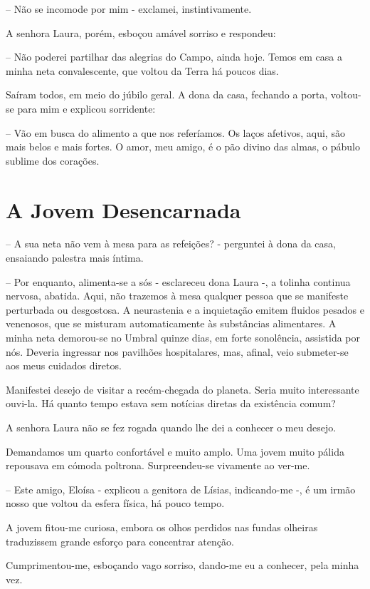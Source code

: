 \documentclass[portuguese,12pt,a4paper]{scrbook}
\begin{document}
	– Não se incomode por mim - exclamei, instintivamente.
	
	A senhora Laura, porém, esboçou amável sorriso e respondeu:
	
	– Não poderei partilhar das alegrias do Campo, ainda hoje. Temos em casa a minha neta convalescente, que voltou da Terra há poucos dias.
	
	Saíram todos, em meio do júbilo geral. A dona da casa, fechando a porta, voltou-se para mim e explicou sorridente:
	
	– Vão em busca do alimento a que nos referíamos. Os laços afetivos, aqui, são mais belos e mais fortes. O amor, meu amigo, é o pão divino das almas, o pábulo sublime dos corações.
	
	
	\chapter{A Jovem Desencarnada}
	
	– A sua neta não vem à mesa para as refeições? - perguntei à dona da casa, ensaiando palestra mais íntima.
	
	– Por enquanto, alimenta-se a sós - esclareceu dona Laura -, a tolinha continua nervosa, abatida. Aqui, não trazemos à mesa qualquer pessoa que se manifeste perturbada ou desgostosa. A neurastenia e a inquietação emitem fluidos pesados e venenosos, que se misturam automaticamente às substâncias alimentares. A minha neta demorou-se no Umbral quinze dias, em forte sonolência, assistida por nós. Deveria ingressar nos pavilhões hospitalares, mas, afinal, veio submeter-se aos meus cuidados diretos.
	
	Manifestei desejo de visitar a recém-chegada do planeta. Seria muito interessante ouvi-la. Há quanto tempo estava sem notícias diretas da existência comum?
	
	A senhora Laura não se fez rogada quando lhe dei a conhecer o meu desejo.
	
	Demandamos um quarto confortável e muito amplo. Uma jovem muito pálida repousava em cómoda poltrona. Surpreendeu-se vivamente ao ver-me.
	
	– Este amigo, Eloísa - explicou a genitora de Lísias, indicando-me -, é um irmão nosso que voltou da esfera física, há pouco tempo.
	
	A jovem fitou-me curiosa, embora os olhos perdidos nas fundas olheiras traduzissem grande esforço para concentrar atenção.
	
	Cumprimentou-me, esboçando vago sorriso, dando-me eu a conhecer, pela minha vez.
	
\end{document}
